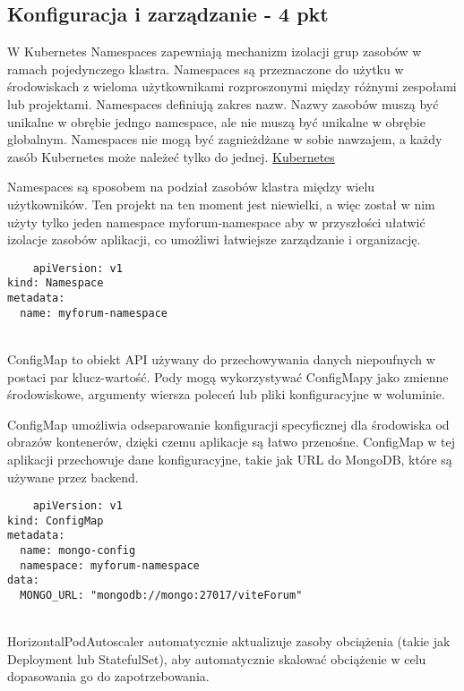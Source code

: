 \documentclass[12pt,a4paper]{article}
\begin{document}
\subsection{Konfiguracja i zarządzanie - 4 pkt}
\label{sec:NonFunctionalConditions}

W Kubernetes Namespaces zapewniają mechanizm izolacji grup zasobów w ramach pojedynczego klastra. Namespaces są przeznaczone do użytku w środowiskach z wieloma użytkownikami rozproszonymi między różnymi zespołami lub projektami. Namespaces definiują zakres nazw. Nazwy zasobów muszą być unikalne w obrębie jedngo namespace, ale nie muszą być unikalne w obrębie globalnym. Namespaces nie mogą być zagnieżdżane w sobie nawzajem, a każdy zasób Kubernetes może należeć tylko do jednej. \href{https://github.com/rohitg00/DevOps_Books/blob/main/The%20Kubernetes%20Book%20(Nigel%20Poulton)%20(z-lib.org).pdf}{Kubernetes} \cite{KubernetBook}

Namespaces są sposobem na podział zasobów klastra między wielu użytkowników. Ten projekt na ten moment jest niewielki, a więc został w nim użyty tylko jeden namespace myforum-namespace aby w przyszłości ułatwić izolacje zasobów aplikacji, co umożliwi łatwiejsze zarządzanie i organizację.
\begin{verbatim}
    apiVersion: v1
kind: Namespace
metadata:
  name: myforum-namespace

\end{verbatim}
\\
ConfigMap to obiekt API używany do przechowywania danych niepoufnych w postaci par klucz-wartość. Pody mogą wykorzystywać ConfigMapy jako zmienne środowiskowe, argumenty wiersza poleceń lub pliki konfiguracyjne w woluminie.

ConfigMap umożliwia odseparowanie konfiguracji specyficznej dla środowiska od obrazów kontenerów, dzięki czemu aplikacje są łatwo przenośne.
ConfigMap w tej aplikacji przechowuje dane konfiguracyjne, takie jak URL do MongoDB, które są używane przez backend.

\begin{verbatim}
    apiVersion: v1
kind: ConfigMap
metadata:
  name: mongo-config
  namespace: myforum-namespace
data:
  MONGO_URL: "mongodb://mongo:27017/viteForum"
\end{verbatim}
\\

HorizontalPodAutoscaler automatycznie aktualizuje zasoby obciążenia (takie jak Deployment lub StatefulSet), aby automatycznie skalować obciążenie w celu dopasowania go do zapotrzebowania.
\end{document}
